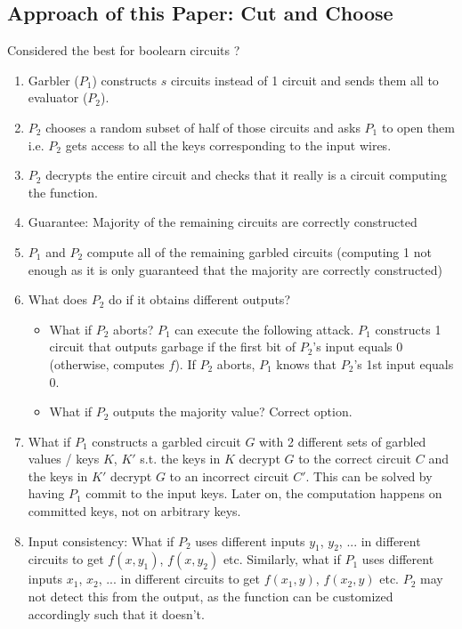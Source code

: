 \subsection{Approach of this Paper: Cut and Choose}
Considered the best for boolearn circuits ? \\
\begin{enumerate}
    \item Garbler ($P_1$) constructs $s$ circuits instead of 1 circuit and sends them all to evaluator ($P_2$).
    \item $P_2$ chooses a random subset of half of those circuits and asks $P_1$ to open them i.e. $P_2$ gets access to all the keys corresponding to the input wires.
    \item $P_2$ decrypts the entire circuit and checks that it really is a circuit computing the function.
    \item Guarantee: Majority of the remaining circuits are correctly constructed
    \item $P_1$ and $P_2$ compute all of the remaining garbled circuits (computing 1 not enough as it is only guaranteed that the majority are correctly constructed)
    \item What does $P_2$ do if it obtains different outputs?
    \begin{itemize}
        \item What if $P_2$ aborts? $P_1$ can execute the following attack. $P_1$ constructs 1 circuit that outputs garbage if the first bit of $P_2$'s input equals 0 (otherwise, computes $f$). If $P_2$ aborts, $P_1$ knows that $P_2$'s 1st input equals 0.
        \item What if $P_2$ outputs the majority value? Correct option. 
    \end{itemize}
    \item What if $P_1$ constructs a garbled circuit $G$ with 2 different sets of garbled values / keys $K$, $K'$ s.t. the keys in $K$ decrypt $G$ to the correct circuit $C$ and the keys in $K'$ decrypt $G$ to an incorrect circuit $C'$. This can be solved by having $P_1$ commit to the input keys. Later on, the computation happens on committed keys, not on arbitrary keys.
    \item Input consistency: What if $P_2$ uses different inputs $y_1$, $y_2$, ... in different circuits to get $f(x, y_1)$, $f(x, y_2)$ etc. Similarly, what if $P_1$ uses different inputs $x_1$, $x_2$, ... in different circuits to get $f(x_1, y)$, $f(x_2, y)$ etc. $P_2$ may not detect this from the output, as the function can be customized accordingly such that it doesn't.

\end{enumerate}
